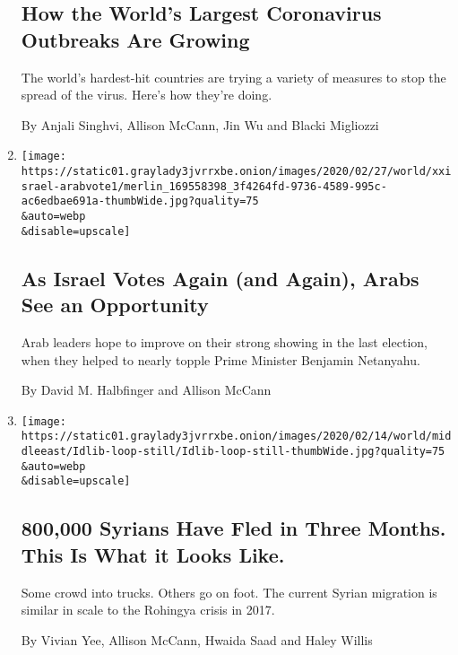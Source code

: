 \begin{enumerate}
  \hypertarget{how-the-worlds-largest-coronavirus-outbreaks-are-growing}{%
  \subsection{How the World's Largest Coronavirus Outbreaks Are
  Growing}\label{how-the-worlds-largest-coronavirus-outbreaks-are-growing}}

  The world's hardest-hit countries are trying a variety of measures to
  stop the spread of the virus. Here's how they're doing.

  By Anjali Singhvi, Allison McCann, Jin Wu and Blacki Migliozzi
\item
  \href{/2020/02/28/world/middleeast/israel-arabs-election-vote.html}{}

  \texttt{[image: https://static01.graylady3jvrrxbe.onion/images/2020/02/27/world/xxisrael-arabvote1/merlin\_169558398\_3f4264fd-9736-4589-995c-ac6edbae691a-thumbWide.jpg?quality=75\\\&auto=webp\\\&disable=upscale]}

  \hypertarget{as-israel-votes-again-and-again-arabs-see-an-opportunity}{%
  \subsection{As Israel Votes Again (and Again), Arabs See an
  Opportunity}\label{as-israel-votes-again-and-again-arabs-see-an-opportunity}}

  Arab leaders hope to improve on their strong showing in the last
  election, when they helped to nearly topple Prime Minister Benjamin
  Netanyahu.

  By David M. Halbfinger and Allison McCann
\item
  \href{/interactive/2020/02/14/world/middleeast/syria-idlib-displaced.html}{}

  \texttt{[image: https://static01.graylady3jvrrxbe.onion/images/2020/02/14/world/middleeast/Idlib-loop-still/Idlib-loop-still-thumbWide.jpg?quality=75\\\&auto=webp\\\&disable=upscale]}

  \hypertarget{800000-syrians-have-fled-in-three-months-this-is-what-it-looks-like}{%
  \subsection{800,000 Syrians Have Fled in Three Months. This Is What it
  Looks
  Like.}\label{800000-syrians-have-fled-in-three-months-this-is-what-it-looks-like}}

  Some crowd into trucks. Others go on foot. The current Syrian
  migration is similar in scale to the Rohingya crisis in 2017.

  By Vivian Yee, Allison McCann, Hwaida Saad and Haley Willis
\end{enumerate}

